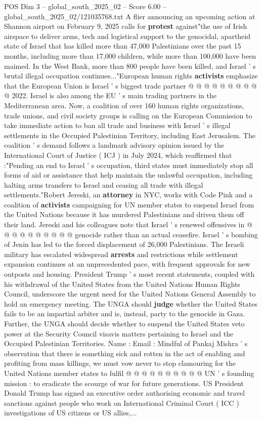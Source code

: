 \begin{textsample}{POS Dim 3 – global\_south\_2025\_02 – Score 6.00 – global\_south\_2025\_02/121035768.txt}
A flier announcing an upcoming action at Shannon airport on February 9, 2025 calls for \textbf{protest} against"the use of Irish airspace to deliver arms, tech and logistical support to the genocidal, apartheid state of Israel that has killed more than 47,000 Palestinians over the past 15 months, including more than 17,000 children, while more than 100,000 have been maimed.
In the West Bank, more than 800 people have been killed, and Israel ' s brutal illegal occupation continues..."European human rights \textbf{activists} emphasize that the European Union is Israel ' s biggest trade partner @ @ @ @ @ @ @ @ @ @ 2022.
Israel is also among the EU ' s main trading partners in the Mediterranean area.
Now, a coalition of over 160 human rights organizations, trade unions, and civil society groups is calling on the European Commission to take immediate action to ban all trade and business with Israel ' s illegal settlements in the Occupied Palestinian Territory, including East Jerusalem.
The coalition ' s demand follows a landmark advisory opinion issued by the International Court of Justice ( ICJ ) in July 2024, which reaffirmed that :"Pending an end to Israel ' s occupation, third states must immediately stop all forms of aid or assistance that help maintain the unlawful occupation, including halting arms transfers to Israel and ceasing all trade with illegal settlements."Robert Jereski, an \textbf{attorney} in NYC, works with Code Pink and a coalition of \textbf{activists} campaigning for UN member states to suspend Israel from the United Nations because it has murdered Palestinians and driven them off their land.
Jereski and his colleagues note that Israel ' s renewed offensives in @ @ @ @ @ @ @ @ @ @ genocide rather than an actual ceasefire.
Israel ' s bombing of Jenin has led to the forced displacement of 26,000 Palestinians.
The Israeli military has escalated widespread \textbf{arrests} and restrictions while settlement expansion continues at an unprecedented pace, with frequent approvals for new outposts and housing.
President Trump ' s most recent statements, coupled with his withdrawal of the United States from the United Nations Human Rights Council, underscore the urgent need for the United Nations General Assembly to hold an emergency meeting.
The UNGA should \textbf{judge} whether the United States fails to be an impartial arbiter and is, instead, party to the genocide in Gaza.
Further, the UNGA should decide whether to suspend the United States veto power at the Security Council visavis matters pertaining to Israel and the Occupied Palestinian Territories.
Name : Email : Mindful of Pankaj Mishra ' s observation that there is something sick and rotten in the act of enabling and profiting from mass killings, we must vow never to stop clamouring for the United Nations member states to fulfil @ @ @ @ @ @ @ @ @ @ UN ' s founding mission : to eradicate the scourge of war for future generations.
US President Donald Trump has signed an executive order authorising economic and travel sanctions against people who work on International Criminal Court ( ICC ) investigations of US citizens or US allies,...

\end{textsample}
